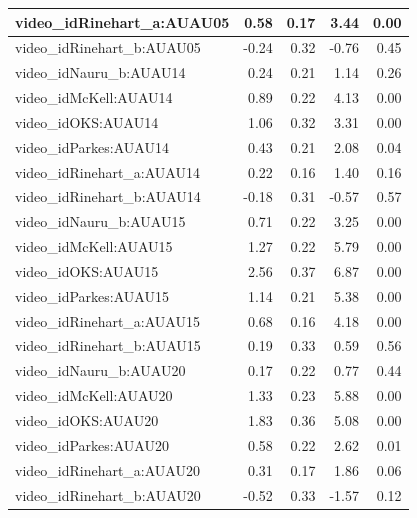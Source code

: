 \documentclass{monashthesis}
\begin{document}
\begin{tabular}{l|r|r|r|r}
\hline
video\_idRinehart\_a:AUAU05 & 0.58 & 0.17 & 3.44 & 0.00\\
\hline
video\_idRinehart\_b:AUAU05 & -0.24 & 0.32 & -0.76 & 0.45\\
\hline
video\_idNauru\_b:AUAU14 & 0.24 & 0.21 & 1.14 & 0.26\\
\hline
video\_idMcKell:AUAU14 & 0.89 & 0.22 & 4.13 & 0.00\\
\hline
video\_idOKS:AUAU14 & 1.06 & 0.32 & 3.31 & 0.00\\
\hline
video\_idParkes:AUAU14 & 0.43 & 0.21 & 2.08 & 0.04\\
\hline
video\_idRinehart\_a:AUAU14 & 0.22 & 0.16 & 1.40 & 0.16\\
\hline
video\_idRinehart\_b:AUAU14 & -0.18 & 0.31 & -0.57 & 0.57\\
\hline
video\_idNauru\_b:AUAU15 & 0.71 & 0.22 & 3.25 & 0.00\\
\hline
video\_idMcKell:AUAU15 & 1.27 & 0.22 & 5.79 & 0.00\\
\hline
video\_idOKS:AUAU15 & 2.56 & 0.37 & 6.87 & 0.00\\
\hline
video\_idParkes:AUAU15 & 1.14 & 0.21 & 5.38 & 0.00\\
\hline
video\_idRinehart\_a:AUAU15 & 0.68 & 0.16 & 4.18 & 0.00\\
\hline
video\_idRinehart\_b:AUAU15 & 0.19 & 0.33 & 0.59 & 0.56\\
\hline
video\_idNauru\_b:AUAU20 & 0.17 & 0.22 & 0.77 & 0.44\\
\hline
video\_idMcKell:AUAU20 & 1.33 & 0.23 & 5.88 & 0.00\\
\hline
video\_idOKS:AUAU20 & 1.83 & 0.36 & 5.08 & 0.00\\
\hline
video\_idParkes:AUAU20 & 0.58 & 0.22 & 2.62 & 0.01\\
\hline
video\_idRinehart\_a:AUAU20 & 0.31 & 0.17 & 1.86 & 0.06\\
\hline
video\_idRinehart\_b:AUAU20 & -0.52 & 0.33 & -1.57 & 0.12\\
\hline
\end{tabular}
\end{document}

